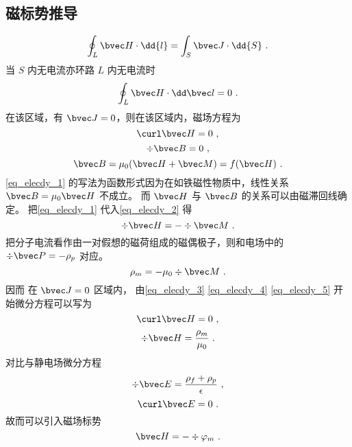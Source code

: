 
\subsection{磁标势推导}
\begin{equation}
\oint_L \bvec H \cdot \dd{l} = \int_S \bvec J \cdot \dd{S}~.
\end{equation}
当 $S$ 内无电流亦环路 $L$ 内无电流时
\begin{equation}
\oint_ L\bvec H \cdot \dd \bvec l = 0~.
\end{equation}
在该区域，有 $\bvec J=0$，则在该区域内，磁场方程为 
\begin{equation}\label{eq_elecdy_3}
\curl \bvec H =0~,
\end{equation}
\begin{equation}\label{eq_elecdy_2}
\div \bvec B=0~,
\end{equation}
\begin{equation}\label{eq_elecdy_1}
\bvec B=\mu_0(\bvec H+\bvec M)=f(\bvec H)~.
\end{equation}
\autoref{eq_elecdy_1} 的写法为函数形式因为在如铁磁性物质中，线性关系 $\bvec B=\mu_0 \bvec H$ 不成立。
而 $\bvec H$ 与 $\bvec B$ 的关系可以由磁滞回线确定。
把\autoref{eq_elecdy_1} 代入\autoref{eq_elecdy_2} 得
\begin{equation}\label{eq_elecdy_4}
\div \bvec H= - \div \bvec M~.
\end{equation}
把分子电流看作由一对假想的磁荷组成的磁偶极子，则和电场中的 $\div \bvec P=-\rho _p$ 对应。
\begin{equation}\label{eq_elecdy_5}
\rho_m=-\mu_0 \div \bvec M~.
\end{equation}
因而 在 $\bvec J=0$ 区域内， 由\autoref{eq_elecdy_3} \autoref{eq_elecdy_4} \autoref{eq_elecdy_5} 开始微分方程可以写为
\begin{equation}
\curl \bvec H=0 ~,
\end{equation}
\begin{equation}
\div \bvec H= \dfrac{\rho_m}{\mu_0}~.
\end{equation}
对比与静电场微分方程
\begin{equation}
\div \bvec E=\dfrac{\rho_f+\rho_p}{\epsilon}~,
\end{equation}
\begin{equation}
\curl \bvec E=0~.
\end{equation}
故而可以引入磁场标势
\begin{equation}
\bvec H=-\div \varphi_m~.
\end{equation}
